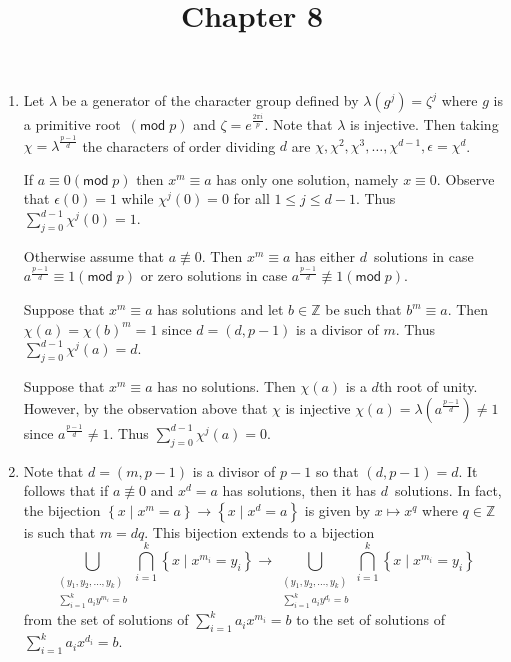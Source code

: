 \documentclass[12pt]{article}
\title{Chapter 8}
\author{}\date{}
\renewcommand{\pmod}[1]{\left(\mathsf{mod}\;#1\right)}
\begin{document}
\maketitle

\begin{enumerate}
\item %

Let $\lambda$ be a generator of the character group
defined by $\lambda\left(g^j\right)=\zeta^j$
where $g$ is a primitive root~$\pmod{p}$
and $\zeta=e^{\frac{2\pi i}{p}}$.
Note that $\lambda$ is injective.
Then taking $\chi=\lambda^{\frac{p-1}{d}}$ the characters
of order dividing $d$ are
$\chi,\chi^2,\chi^3,\ldots,\chi^{d-1},\epsilon=\chi^d$.

If $a\equiv 0\pmod{p}$ then $x^m\equiv a$ has
only one solution, namely $x\equiv 0$.
Observe that $\epsilon\left(0\right)=1$ while
$\chi^j\left(0\right)=0$ for all $1\le j\le d-1$.
Thus $\sum_{j=0}^{d-1}\chi^j\left(0\right)=1$.

Otherwise assume that $a\not\equiv 0$.
Then $x^m\equiv a$ has either $d$~solutions
in case $a^{\frac{p-1}{d}}\equiv 1\pmod{p}$ or
zero solutions in case $a^{\frac{p-1}{d}}\not\equiv 1\pmod{p}$.

Suppose that $x^m\equiv a$ has solutions and let $b\in\mathbb{Z}$
be such that $b^m\equiv a$.
Then $\chi\left(a\right)=\chi\left(b\right)^m=1$ since
$d=\left(d,p-1\right)$ is a divisor of $m$. Thus
$\sum_{j=0}^{d-1}\chi^j\left(a\right)=d$.

Suppose that $x^m\equiv a$ has no solutions.
Then $\chi\left(a\right)$ is a $d$th root of unity.
However, by the observation above that $\chi$
is injective $\chi\left(a\right)
=\lambda\left(a^{\frac{p-1}{d}}\right)\ne 1$
since $a^{\frac{p-1}{d}}\ne 1$.
Thus $\sum_{j=0}^{d-1}\chi^j\left(a\right)=0$.

\item %
Note that $d=\left(m,p-1\right)$ is a divisor
of $p-1$ so that $\left(d,p-1\right)=d$.
It follows that if $a\not\equiv 0$ and
$x^d=a$ has solutions, then it has $d$~solutions.
In fact, the bijection $\left\{x\mid x^m=a\right\}\to
\left\{x\mid x^d=a\right\}$ is given by $x\mapsto x^q$
where $q\in\mathbb{Z}$ is such that $m=dq$.
This bijection extends to a bijection
\[\bigcup_{\substack{\left(y_1,y_2,\ldots,y_k\right)\\
\sum_{i=1}^ka_iy^{m_i}=b}}
\bigcap_{i=1}^k\left\{x\mid x^{m_i}=y_i\right\}
\longrightarrow\bigcup_{\substack{\left(y_1,y_2,\ldots,y_k\right)\\
\sum_{i=1}^ka_iy^{d_i}=b}}
\bigcap_{i=1}^k\left\{x\mid x^{m_i}=y_i\right\}\]
from the set of solutions of $\sum_{i=1}^ka_ix^{m_i}=b$
to the set of solutions of $\sum_{i=1}^ka_ix^{d_i}=b$.


\end{enumerate}
\end{document}
